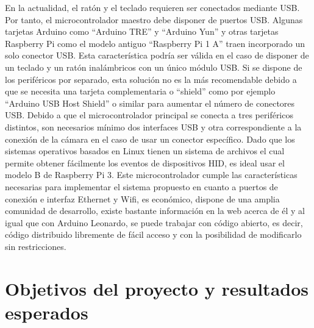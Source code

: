 En la actualidad, el ratón y el teclado requieren ser conectados mediante USB. Por tanto, el microcontrolador maestro debe disponer de puertos USB. Algunas tarjetas Arduino como “Arduino TRE” y “Arduino Yun” y otras tarjetas Raspberry Pi como el modelo antiguo “Raspberry Pi 1 A” traen incorporado un solo conector USB. Esta característica podría ser válida en el caso de disponer de un teclado y un ratón inalámbricos con un único módulo USB. Si se dispone de los periféricos por separado, esta solución no es la más recomendable debido a que se necesita una tarjeta complementaria o ``shield'' como por ejemplo ``Arduino USB Host Shield'' o similar para aumentar el número de conectores USB. Debido a que el microcontrolador principal se conecta a tres periféricos distintos, son necesarios mínimo dos interfaces USB y otra correspondiente a la conexión de la cámara en el caso de usar un conector específico. Dado que los sistemas operativos basados en Linux tienen un sistema de archivos el cual permite obtener fácilmente los eventos de dispositivos HID, es ideal usar el modelo B de Raspberry Pi 3. Este microcontrolador cumple las características necesarias para implementar el sistema propuesto en cuanto a puertos de conexión e interfaz Ethernet y Wifi, es económico, dispone de una amplia comunidad de desarrollo, existe bastante información en la web acerca de él y al igual que con Arduino Leonardo, se puede trabajar con código abierto, es decir, código distribuido libremente de fácil acceso y con la posibilidad de modificarlo sin restricciones.

\clearpage
\section{Objetivos del proyecto y resultados esperados} \label{s1_4}

